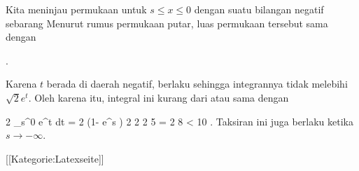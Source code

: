 Kita meninjau permukaan untuk $s \leq x \leq 0$ dengan suatu bilangan negatif sebarang
 Menurut rumus permukaan putar, luas permukaan tersebut sama dengan

 { . }

Karena $t$ berada di daerah negatif, berlaku
 sehingga integrannya tidak melebihi $\sqrt{2} e^t$. Oleh karena itu, integral ini kurang dari atau sama dengan

\mavergleichskettedisp
{\vergleichskette
{ 2 \pi {}  \int_s^0 e^t dt
}
{ =} { 2 \pi {} (1- e^s )
}
{ \leq} { 2 \pi {}
}
{ \leq} { 2 2 5
}
{ =} { 2 8
}
}
{
\vergleichskettefortsetzung
{ <} { 10
}
{ } {}
{ } {}
{ } {}
}{}{.}
Taksiran ini juga berlaku ketika $s \rightarrow - \infty$.

 [[Kategorie:Latexseite]]
